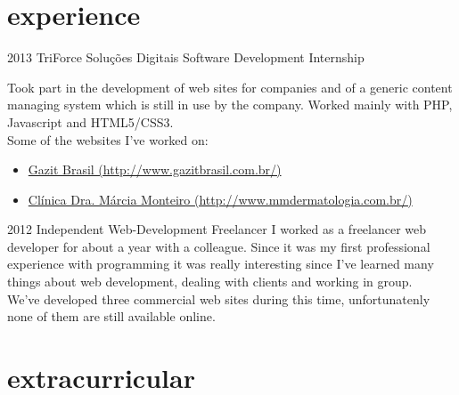 \documentclass[]{friggeri-cv} %
\begin{document}

\section{experience}

\begin{entrylist}


\entry
{2013}
{TriForce Soluções Digitais}
{Software Development Internship}
{Took part in the development of web sites for companies and of a generic content managing system which is still in use by the company. Worked mainly with PHP, Javascript and HTML5/CSS3. \\
Some of the websites I've worked on:
\begin{itemize}
\item \href{http://www.gazitbrasil.com.br/}{Gazit Brasil (http://www.gazitbrasil.com.br/)}
\item \href{http://www.mmdermatologia.com.br/}{Clínica Dra. Márcia Monteiro (http://www.mmdermatologia.com.br/)}
\end{itemize}}

\entry
{2012}
{Independent Web-Development}
{Freelancer}
{I worked as a freelancer web developer for about a year with a colleague. Since it was my first professional experience with programming it was really interesting since I've learned many things about web development, dealing with clients and working in group. \\
We've developed three commercial web sites during this time, unfortunatenly none of them are still available online.}

\end{entrylist}


\section{extracurricular}
\end{document}

